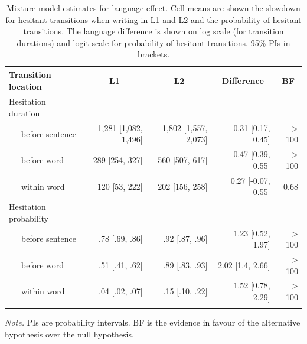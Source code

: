 \documentclass[
  man,floatsintext]{apa7}
\begin{document}
\begin{table}[b]

\begin{center}
\begin{threeparttable}

\caption{\label{tab:l2effect}Mixture model estimates for language effect. Cell means are shown the slowdown for hesitant transitions when writing in L1 and L2 and the probability of hesitant transitions. The language difference is shown on log scale (for transition durations) and logit scale for probability of hesitant transitions. 95\% PIs in brackets.}

\small{

\begin{tabular}{lrrrr}
\toprule
Transition location & \multicolumn{1}{c}{L1} & \multicolumn{1}{c}{L2} & \multicolumn{1}{c}{Difference} & \multicolumn{1}{c}{BF}\\
\midrule
Hesitation duration &  &  &  & \\
\ \ \ before sentence & 1,281 [1,082, 1,496] & 1,802 [1,557, 2,073] & 0.31 [0.17, 0.45] & > 100\\
\ \ \ before word & 289 [254, 327] & 560 [507, 617] & 0.47 [0.39, 0.55] & > 100\\
\ \ \ within word & 120 [53, 222] & 202 [156, 258] & 0.27 [-0.07, 0.55] & 0.68\\
Hesitation probability &  &  &  & \\
\ \ \ before sentence & .78 [.69, .86] & .92 [.87, .96] & 1.23 [0.52, 1.97] & > 100\\
\ \ \ before word & .51 [.41, .62] & .89 [.83, .93] & 2.02 [1.4, 2.66] & > 100\\
\ \ \ within word & .04 [.02, .07] & .15 [.10, .22] & 1.52 [0.78, 2.29] & > 100\\
\bottomrule
\addlinespace
\end{tabular}

}

\begin{tablenotes}[para]
\normalsize{\textit{Note.} PIs are probability intervals. BF is the evidence in favour of the alternative hypothesis over the null hypothesis.}
\end{tablenotes}

\end{threeparttable}
\end{center}

\end{table}

\newpage
\end{document}
